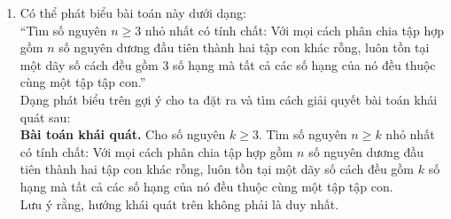 \begin{bt}
{\begin{nx}
\begin{enumerate}[1]
\begin{enumerate}[-]
		\item  Nhiều học sinh do chưa hiểu rõ khái niệm giá trị lớn nhất, giá trị nhỏ nhất nên đã giải bài toán theo lượt đồ sau:
		\begin{enumerate}[+]
			\item Chứng minh số $n$ thuộc tập  hợp $\{3;4;5;6;7;8\}$ không có tính chất như đề bài yêu cầu;
			\item Chứng minh $n=9$ là số có tính chất  như đề bài yêu cầu;
			\item Chứng minh tất cả các số nguyên $n>9$ đều có tính chất  như đề bài yêu cầu;
			\item Từ chứng minh ở các bước trên, suy ra $n=9$ là số nguyên nhỏ nhất cần tìm.
		\end{enumerate}
	\end{enumerate}

	\item Có thể phát biểu bài toán này dưới dạng:\\
	``Tìm số nguyên $n\geq 3$ nhỏ nhất có tính chất: Với mọi cách phân chia tập hợp gồm $n$ số nguyên dương đầu tiên thành hai tập con khác rỗng, luôn tồn tại một dãy số cách đều gồm $3$ số hạng mà tất cả các số hạng của nó đều thuộc cùng một tập tập con.''\\
	Dạng phát biểu trên gợi ý cho ta đặt ra và tìm cách giải quyết bài toán khái quát sau:\\
\textbf{	Bài toán khái quát.} Cho số nguyên $k\geq 3.$ Tìm số nguyên $n\geq k$ nhỏ nhất có tính chất:  Với mọi cách phân chia tập hợp gồm $n$ số nguyên dương đầu tiên thành hai tập con khác rỗng, luôn tồn tại một dãy số cách đều gồm $k$ số hạng mà tất cả các số hạng của nó đều thuộc cùng một tập tập con.\\ 
Lưu ý rằng, hướng khái quát trên không phải là duy nhất.

\end{enumerate}
\end{nx}
}

\end{bt}

